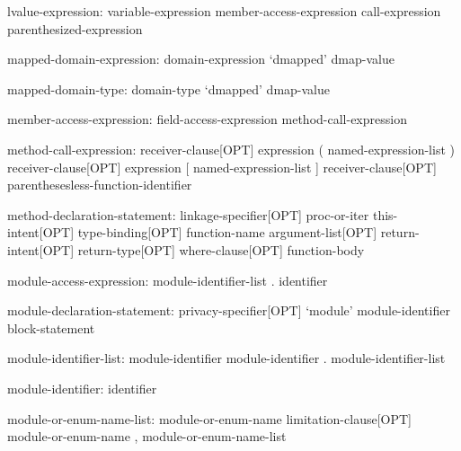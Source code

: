 \begin{syntax}
lvalue-expression:
  variable-expression
  member-access-expression
  call-expression
  parenthesized-expression
\end{syntax}

\begin{syntax}
mapped-domain-expression:
  domain-expression `dmapped' dmap-value
\end{syntax}

\begin{syntax}
mapped-domain-type:
  domain-type `dmapped' dmap-value
\end{syntax}

\begin{syntax}
member-access-expression:
  field-access-expression
  method-call-expression
\end{syntax}

\begin{syntax}
method-call-expression:
  receiver-clause[OPT] expression ( named-expression-list )
  receiver-clause[OPT] expression [ named-expression-list ]
  receiver-clause[OPT] parenthesesless-function-identifier
\end{syntax}

\begin{syntax}
method-declaration-statement:
  linkage-specifier[OPT] proc-or-iter this-intent[OPT] type-binding[OPT] function-name argument-list[OPT] 
    return-intent[OPT] return-type[OPT] where-clause[OPT] function-body
\end{syntax}

\begin{syntax}
module-access-expression:
  module-identifier-list . identifier
\end{syntax}

\begin{syntax}
module-declaration-statement:
  privacy-specifier[OPT] `module' module-identifier block-statement
\end{syntax}

\begin{syntax}
module-identifier-list:
  module-identifier
  module-identifier . module-identifier-list
\end{syntax}

\begin{syntax}
module-identifier:
  identifier
\end{syntax}

\begin{syntax}
module-or-enum-name-list:
  module-or-enum-name limitation-clause[OPT]
  module-or-enum-name , module-or-enum-name-list
\end{syntax}

